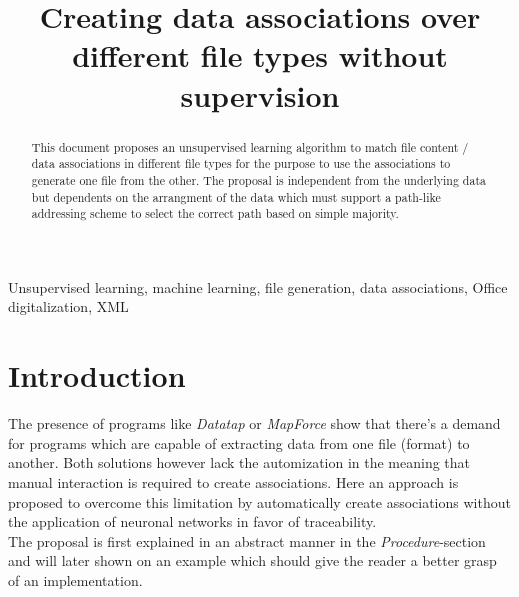 \documentclass[conference]{IEEEtran}
\begin{document}
\title{Creating data associations over different file types without supervision}
\author{
}

\maketitle

\begin{abstract}
This document proposes an unsupervised learning algorithm to match file content / data
associations in different file types for the purpose to use the associations to generate
one file from the other. The proposal is independent from the underlying data but
dependents on the arrangment of the data which must support a path-like addressing scheme
to select the correct path based on simple majority.
\end{abstract}

\begin{IEEEkeywords}
Unsupervised learning, machine learning, file generation, data associations, Office
digitalization, XML
\end{IEEEkeywords}

\section{Introduction}
The presence of programs like \textit{Datatap} \cite{adverity:adverity} or \textit{MapForce}
\cite{altova:mapforce} show that there's a demand for programs which are capable of extracting
data from one file (format) to another. Both solutions however lack the automization in the
meaning that manual interaction is required to create associations. Here an approach is proposed
to overcome this limitation by automatically create associations without the application of
neuronal networks in favor of traceability.\\
The proposal is first explained in an abstract manner in the \textit{Procedure}-section and
will later shown on an example which should give the reader a better grasp of an
implementation.
\end{document}
